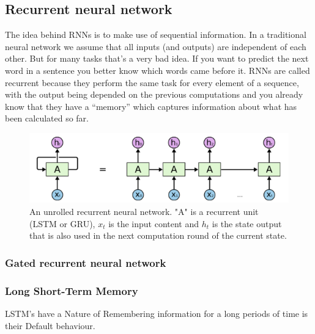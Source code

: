 \documentclass[8pt,conference,compsocconf]{IEEEtran}
\begin{document}
\subsection{Recurrent neural network}
The idea behind RNNs is to make use of sequential information. In a traditional neural network we assume that all inputs (and outputs) are independent of each other. But for many tasks that’s a very bad idea. If you want to predict the next word in a sentence you better know which words came before it. RNNs are called recurrent because they perform the same task for every element of a sequence, with the output being depended on the previous computations and you already know that they have a “memory” which captures information about what has been calculated so far.
	\begin{figure}[t]
	\centering
	\includegraphics[width=0.9 \linewidth]{fig/rnn.png}
	\caption{An unrolled recurrent neural network. "A" is a recurrent unit (LSTM or GRU), $x_t$ is the input content and $h_t$ is the state output that is also used in the next computation round of the current state.}
	\label{fig:rnn}
\end{figure}

\subsubsection{Gated recurrent neural network}

\subsubsection{Long Short-Term Memory}
LSTM’s have a Nature of Remembering information for a long periods of time is their Default behaviour.
\end{document}
